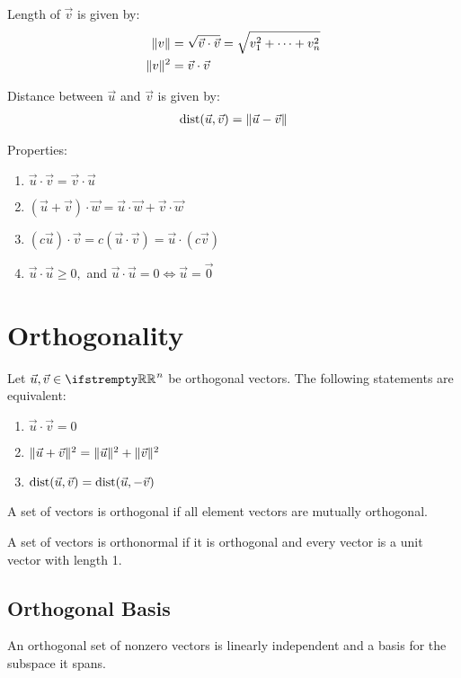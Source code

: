 \documentclass[12pt, a4paper]{article}
\begin{document}
\begin{multicols*}{3}
Length of $\vec{v}$  is given by:
\begin{align*}
  \lVert v\rVert &= \sqrt{\vec{v}\cdot\vec{v}} = \sqrt{v^2_1 + \cdots + v^2_n}\\
  \lVert v\rVert^2 &= \vec{v}\cdot\vec{v}
\end{align*}

Distance between $\vec{u}$ and $\vec{v}$ is given by:
\begin{align*}
  \operatorname{dist}(\vec{u}, \vec{v}) = \lVert\vec{u} - \vec{v}\rVert
\end{align*}

Properties:
\begin{enumerate}[\roman*.]
  \item $\vec{u} \cdot \vec{v} = \vec{v} \cdot \vec{u}$
  \item $(\vec{u} + \vec{v}) \cdot \vec{w} = \vec{u} \cdot \vec{w} + \vec{v} \cdot \vec{w}$
  \item $(c \vec{u}) \cdot \vec{v} = c (\vec{u} \cdot \vec{v}) = \vec{u} \cdot (c \vec{v})$
  \item $\vec{u} \cdot \vec{u} \geq 0,$ and $\vec{u} \cdot \vec{u} = 0 \iff \vec{u} = \vec{0}$
\end{enumerate}

\colbreak

\section{Orthogonality}

Let $\vec{u}, \vec{v} \in \RR^n$ be orthogonal vectors. The following statements are equivalent:
\begin{enumerate}[\roman*.]
  \item $\vec{u} \cdot \vec{v} = 0$
  \item $\lVert\vec{u} + \vec{v}\rVert^2 = \lVert\vec{u}\rVert^2 + \lVert\vec{v}\rVert^2$
  \item $\operatorname{dist}(\vec{u}, \vec{v}) = \operatorname{dist}(\vec{u}, -\vec{v})$
\end{enumerate}

A set of vectors is orthogonal if all element vectors are mutually orthogonal.

A set of vectors is orthonormal if it is orthogonal and every vector is a unit vector with length 1.

\subsection{Orthogonal Basis}
An orthogonal set of nonzero vectors is linearly independent and a basis for the subspace it spans. 


\end{multicols*}
\end{document}
